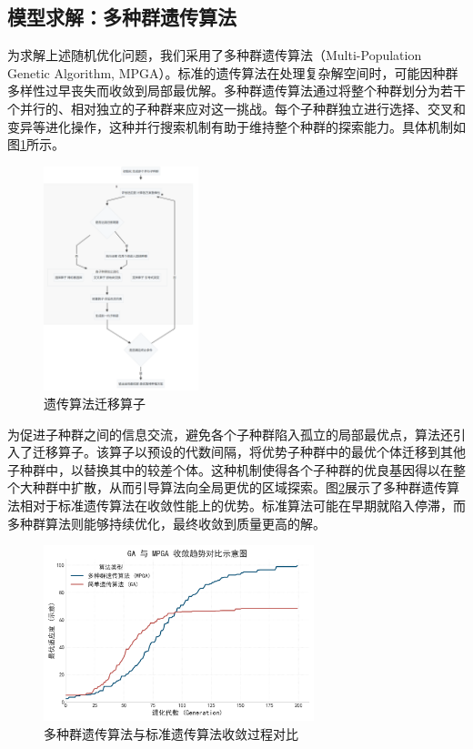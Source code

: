 \subsection{模型求解：多种群遗传算法}
为求解上述随机优化问题，我们采用了多种群遗传算法（Multi-Population Genetic Algorithm, MPGA）。标准的遗传算法在处理复杂解空间时，可能因种群多样性过早丧失而收敛到局部最优解。多种群遗传算法通过将整个种群划分为若干个并行的、相对独立的子种群来应对这一挑战。每个子种群独立进行选择、交叉和变异等进化操作，这种并行搜索机制有助于维持整个种群的探索能力。具体机制如图\ref{fig:transfer_operator}所示。

\begin{figure}[H]
	\centering
	\includegraphics[width=0.4\textwidth]{figs/4问题二/多种群遗传算法.png}
	\caption{遗传算法迁移算子}
	\label{fig:transfer_operator}
\end{figure}



为促进子种群之间的信息交流，避免各个子种群陷入孤立的局部最优点，算法还引入了迁移算子。该算子以预设的代数间隔，将优势子种群中的最优个体迁移到其他子种群中，以替换其中的较差个体。这种机制使得各个子种群的优良基因得以在整个大种群中扩散，从而引导算法向全局更优的区域探索。图\ref{fig:convergence_comparison}展示了多种群遗传算法相对于标准遗传算法在收敛性能上的优势。标准算法可能在早期就陷入停滞，而多种群算法则能够持续优化，最终收敛到质量更高的解。

\begin{figure}[H]
    \centering
    \includegraphics[width=0.7\textwidth]{figs/4问题二/遗传算法收敛对比图.png}

    \caption{多种群遗传算法与标准遗传算法收敛过程对比}
    \label{fig:convergence_comparison}
\end{figure}

